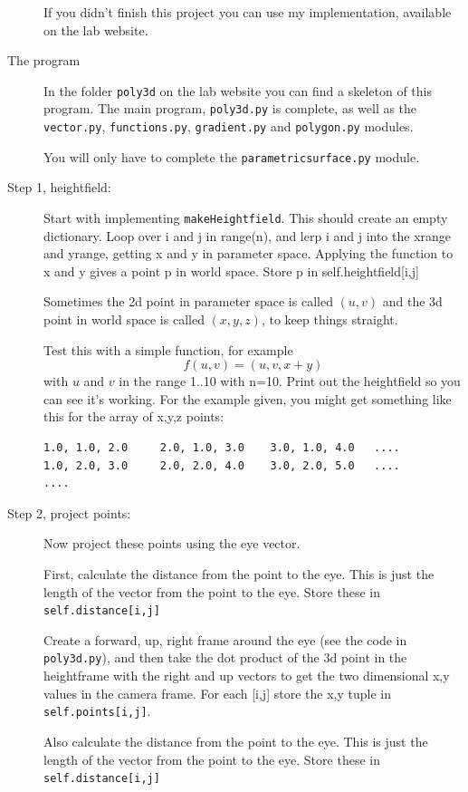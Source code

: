 \documentclass[12pt]{article}
\begin{document}
\begin{description}
If you didn't finish this project you can use my implementation,
available on the lab website.

\item[The program]  In the folder \lstinline{poly3d} on the
lab website you can find a skeleton of this program.  The main
program, \lstinline{poly3d.py} is complete, as well as the 
\lstinline{vector.py}, \lstinline{functions.py}, \lstinline{gradient.py}
 and \lstinline{polygon.py}
modules.

You will only have to complete the \lstinline{parametricsurface.py} module.

\item[Step 1, heightfield:]  
Start with implementing \lstinline{makeHeightfield}.  
This should create an empty dictionary.  Loop over
i and j in range(n), and lerp i and j into the xrange 
and yrange, getting x and y in parameter space.
Applying the function to x and y gives a point p in world
space.  Store p in self.heightfield[i,j]

Sometimes the 2d point in parameter space is called $(u,v)$
and the 3d point in world space is called $(x,y,z)$,
to keep things straight.

Test this with a simple function, for example 
\[f(u,v) = (u,v,x+y)\]
with $u$ and $v$ in the range 1..10 with n=10.  Print out the heightfield
so you can see it's working.  For the example given, you might
get something like this for the array of x,y,z points:
\begin{lstlisting}
1.0, 1.0, 2.0     2.0, 1.0, 3.0    3.0, 1.0, 4.0   ....
1.0, 2.0, 3.0     2.0, 2.0, 4.0    3.0, 2.0, 5.0   ....
....
\end{lstlisting}

\item[Step 2, project points:] 
Now project these points using the eye vector.

First, calculate the distance from the point to the eye.
This is just the length of the vector from the point to the eye.
Store these in \lstinline{self.distance[i,j]}

Create a forward, up, right frame around the eye
(see the code in \lstinline{poly3d.py}),
and then take the dot product of the 3d point in the heightframe
with the right and up vectors to get the two dimensional
x,y values in the camera frame.  For each [i,j]
store the x,y tuple in \lstinline{self.points[i,j]}.

Also calculate the distance from the point to the eye.
This is just the length of the vector from the point to the eye.
Store these in \lstinline{self.distance[i,j]}


\end{description}
\end{document}
